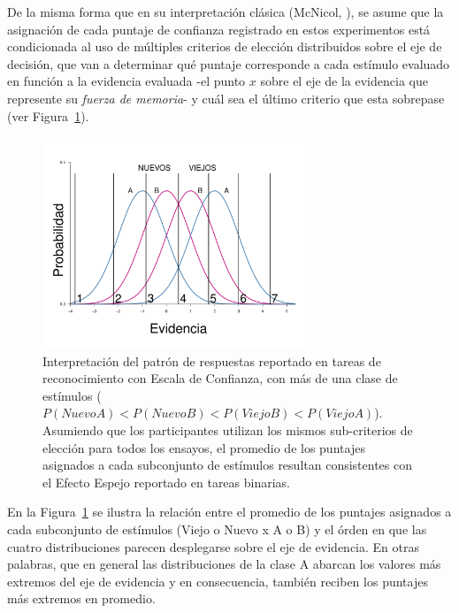 \begin{itemize}
De la misma forma que en su interpretación clásica (McNicol, \citeyear{McNicol2, McNicol5}), se asume que la asignación de cada puntaje de confianza registrado en estos experimentos está condicionada al uso de múltiples criterios de elección distribuidos sobre el eje de decisión, que van a determinar qué puntaje corresponde a cada estímulo evaluado en función a la evidencia evaluada -el punto $x$ sobre el eje de la evidencia que represente su \textit{fuerza de memoria}- y cuál sea el último criterio que esta sobrepase (ver Figura~\ref{fig:Ejem_Efecto_Punt}).\\

\begin{figure}[h]
\centering
\includegraphics[width=0.7\textwidth]{Figures/EfectoEspejo_Puntajes}
\caption[Efecto Espejo en tareas de detección con Escala de Confianza]{Interpretación del patrón de respuestas reportado en tareas de reconocimiento con Escala de Confianza, con más de una clase de estímulos ($P(NuevoA) < P(NuevoB) < P(ViejoB) < P(ViejoA)$). Asumiendo que los participantes utilizan los mismos sub-criterios de elección para todos los ensayos, el promedio de los puntajes asignados a cada subconjunto de estímulos resultan consistentes con el Efecto Espejo reportado en tareas binarias.}
\label{fig:Ejem_Efecto_Punt}
\end{figure}

En la Figura~\ref{fig:Ejem_Efecto_Punt} se ilustra la relación entre el promedio de los puntajes asignados a cada subconjunto de estímulos (Viejo o Nuevo x A o B) y el órden en que las cuatro distribuciones parecen desplegarse sobre el eje de evidencia. En otras palabras, que en general las distribuciones de la clase A abarcan los valores más extremos del eje de evidencia y en consecuencia, también reciben los puntajes más extremos en promedio.\\


\end{itemize}
